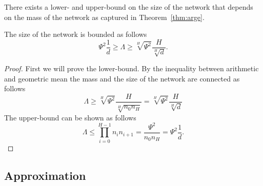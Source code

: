 \documentclass[twoside]{article}
\begin{document}
There exists a lower- and upper-bound on the size of the network that depends on the mass of the network as captured in Theorem~\ref{thm:arge}.
\begin{theorem}
The size of the network is bounded as follows
\[\Psi^2\frac{1}{d} \geq \Lambda \geq \sqrt[H]{\Psi^2}\frac{H}{\sqrt[H]{d}}.
\]
\label{thm:arge}
\end{theorem}
\begin{proof}
First we will prove the lower-bound. By the inequality between arithmetic and geometric mean the mass and the size of the network are connected as follows
\[\Lambda \geq \sqrt[H]{\Psi^2}\frac{H}{\sqrt[H]{n_0n_H}} = \sqrt[H]{\Psi^2}\frac{H}{\sqrt[H]{d}}
\]
The upper-bound can be shown as follows
\[\Lambda \leq \prod_{i=0}^{H-1}n_in_{i+1} = \frac{\Psi^2}{n_0n_H} = \Psi^2\frac{1}{d}.
\]
\end{proof}

\subsection{Approximation}
\end{document}
